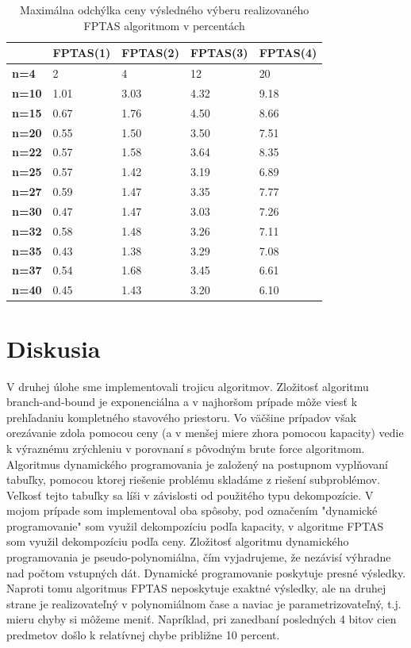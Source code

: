 \documentclass[slovak]{article}
\begin{document}
\begin{table}\centering
	\begin{tabularx}{\textwidth}{ | X | X | X | X | X | }
	  \hline                       
				& \textbf{FPTAS(1)} 	& \textbf{FPTAS(2)} & \textbf{FPTAS(3)} & \textbf{FPTAS(4)}\\ \hline
	  \textbf{n=4} 	& 2 	& 4 	&  12 		&	20 	\\ \hline
	  \textbf{n=10} & 1.01 	& 3.03 	&  4.32 	&	9.18\\ \hline
	  \textbf{n=15} & 0.67 	& 1.76 	&  4.50 	&	8.66\\ \hline
	  \textbf{n=20} & 0.55 	& 1.50 	&  3.50 	&	7.51\\ \hline
	  \textbf{n=22} & 0.57 	& 1.58 	&  3.64 	&	8.35\\ \hline
	  \textbf{n=25} & 0.57 	& 1.42 	&  3.19 	&	6.89\\ \hline
	  \textbf{n=27} & 0.59 	& 1.47 	&  3.35 	&	7.77\\ \hline
	  \textbf{n=30} & 0.47 	& 1.47 	&  3.03 	&	7.26\\ \hline
	  \textbf{n=32} & 0.58 	& 1.48 	&  3.26 	&	7.11\\ \hline
	  \textbf{n=35} & 0.43 	& 1.38 	&  3.29 	&	7.08\\ \hline
	  \textbf{n=37} & 0.54 	& 1.68 	&  3.45 	&	6.61\\ \hline
	  \textbf{n=40} & 0.45 	& 1.43 	&  3.20 	&	6.10\\ \hline
	\end{tabularx}
\caption{Maximálna odchýlka ceny výsledného výberu realizovaného FPTAS algoritmom v percentách}
\label{tab3}
\end{table}


\section{Diskusia}

V druhej úlohe sme implementovali trojicu algoritmov. Zložitosť algoritmu branch-and-bound je exponenciálna a v najhoršom prípade môže viesť k prehľadaniu kompletného stavového priestoru. Vo väčšine prípadov však orezávanie zdola pomocou ceny (a v menšej miere zhora pomocou kapacity) vedie k výraznému zrýchleniu v porovnaní s pôvodným brute force algoritmom. Algoritmus dynamického programovania je založený na postupnom vyplňovaní tabuľky, pomocou ktorej riešenie problému skladáme z riešení subproblémov. Veľkosť tejto tabuľky sa líši v závislosti od použitého typu dekompozície. V mojom prípade som implementoval oba spôsoby, pod označením "dynamické programovanie" som využil dekompozíciu podľa kapacity, v algoritme FPTAS som využil dekompozíciu podľa ceny. Zložitosť algoritmu dynamického programovania je pseudo-polynomiálna, čím vyjadrujeme, že nezávisí výhradne nad počtom vstupných dát. Dynamické programovanie poskytuje presné výsledky. Naproti tomu algoritmus FPTAS neposkytuje exaktné výsledky, ale na druhej strane je realizovateľný v polynomiálnom čase a naviac je parametrizovateľný, t.j. mieru chyby si môžeme meniť. Napríklad, pri zanedbaní posledných 4 bitov cien predmetov došlo k relatívnej chybe približne 10 percent.
\end{document}
